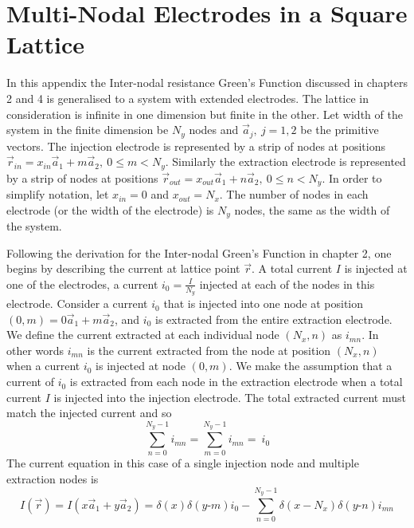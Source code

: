 \chapter{Multi-Nodal Electrodes in a Square Lattice}
\label{appendix: finite square lattice}
In this appendix the Inter-nodal resistance Green's Function discussed in chapters 2 and 4 is generalised to a system with extended electrodes. The lattice in consideration is infinite in one dimension but finite in the other. Let width of the system in the finite dimension be $N_y$ nodes and $\vec{a}_\textit{j}, ~ j = 1,2$ be the primitive vectors. The injection electrode is represented by a strip of nodes at positions $\vec{r}_{in} = x_{in} \vec{a}_1 + m \vec{a}_2, ~ 0\leq m < N_y$. Similarly the extraction electrode is represented by a strip of nodes at positions $\vec{r}_{out} = x_{out} \vec{a}_1 + \textit{n} \vec{a}_2, ~ 0\leq \textit{n} < N_y$. In order to simplify notation, let $x_{in} = 0$ and $x_{out} = N_x$. The number of nodes in each electrode (or the width of the electrode) is $N_y$ nodes, the same as the width of the system. 

Following the derivation for the Inter-nodal Green's Function in chapter 2, one begins by describing the current at lattice point $\vec{r}$. A total current $I$ is injected at one of the electrodes, a current $i_0 = \frac{I}{N_y}$ injected at each of the nodes in this electrode. Consider a current $i_0$ that is injected into one node at position $(0,\textit{m}) = 0\vec{a}_1 + \textit{m}\vec{a}_2$, and $i_0$ is extracted from the entire extraction electrode. We define the current extracted at each individual node $(N_x,\textit{n})$ as $i_{\textit{mn}}$. In other words $i_{\textit{mn}}$ is the current extracted from the node at position $(N_x,\textit{n})$ when a current $i_0$ is injected at node $(0,\textit{m})$. We make the assumption that a current of $i_0$ is extracted from each node in the extraction electrode when a total current $I$ is injected into the injection electrode. The total extracted current must match the injected current and so
\begin{equation}
\sum_{\textit{n}=0}^{N_y-1} i_{\textit{mn}}=\sum_{\textit{m}=0}^{N_y-1} i_{\textit{mn}}= ~i_0
\end{equation}
The current equation in this case of a single injection node and multiple extraction nodes is
\begin{equation}
I(\vec{r})=I(\textit{x}\vec{a}_1 + \textit{y}\vec{a}_2) =  \delta(\textit{x})\delta(\textit{y-m}) i_0 - \sum_{\textit{n}=0}^{N_y-1} \delta(\textit{x} - N_x) \delta(\textit{y-n})  i_{\textit{mn}}
\end{equation}

